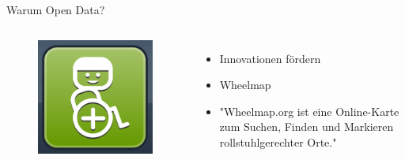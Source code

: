 \begin{frame}[t]{Warum Open Data?}
 \begin{columns}
  \begin{figure}[h]
   \centering
   \includegraphics[scale=0.3]{section_open_data_innovation.png}
  \end{figure}
  \begin{itemize}
   \item Innovationen fördern
   \item Wheelmap \cite{Wheelmap}
   \item "Wheelmap.org ist eine Online-Karte zum Suchen, Finden und Markieren rollstuhlgerechter Orte."
  \end{itemize}
 \end{columns}
\end{frame}


